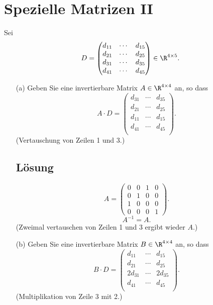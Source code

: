\newpage
\section{Spezielle Matrizen II}

Sei 
$$
	D = 
	\begin{pmatrix}
		d_{11}	&\cdots	&d_{15}\\
		d_{21}	&\cdots	&d_{25}\\		
		d_{31}	&\cdots	&d_{35}\\
		d_{41}	&\cdots	&d_{45}\\
	\end{pmatrix}
	\in \R^{4\times 5}.
$$

\begin{itemize}
	\item[(a)] Geben Sie eine invertierbare Matrix $A\in\R^{4\times 4}$ an, so dass
			$$
				A\cdot D = 
				\begin{pmatrix}
					d_{31}	&\cdots	&d_{35}\\
					d_{21}	&\cdots	&d_{25}\\		
					d_{11}	&\cdots	&d_{15}\\
					d_{41}	&\cdots	&d_{45}\\
				\end{pmatrix}.
			$$
			(Vertauschung von Zeilen 1 und 3.)
		\subsection*{L\"osung}

		$$	
			A =
			\begin{pmatrix}
				0	&0	&1	&0	\\
				0	&1	&0	&0	\\
				1	&0	&0	&0	\\
				0	&0	&0	&1	
			\end{pmatrix}.
		$$
		$$
			A^{-1} = A.
		$$
		(Zweimal vertauschen von Zeilen 1 und 3 ergibt wieder $A$.)			
	\item[(b)] Geben Sie eine invertierbare Matrix $B\in\R^{4\times 4}$ an, so dass
			$$
				B\cdot D = 
				\begin{pmatrix}
					d_{11} 			&\cdots	&d_{15} \\
					d_{21}			&\cdots	&d_{25}\\		
					2d_{31}			&\cdots	&2d_{35}\\
					d_{41}			&\cdots	&d_{45}\\
				\end{pmatrix}.
			$$
			(Multiplikation von Zeile 3 mit 2.)

\end{itemize}
